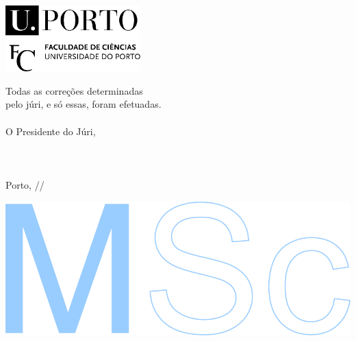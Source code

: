 \documentclass[11pt]{article}
\begin{document}
\raggedleft
\begin{minipage}[b][297mm][b]{54.3mm}
	\includegraphics[width=52mm]{fcup}

	
	{ \noindent\footnotesize Todas as correções determinadas \\
		pelo júri, e só essas, foram efetuadas. \\
		\\
		O Presidente do Júri, \\
		\\ 
		\\
		\\
		Porto, \underline{\qquad\quad}/\underline{\quad\qquad}/\underline{\qquad\qquad} \\
	}


	\includegraphics[scale=0.97]{msc}
\end{minipage}

\newpage


\end{document}
